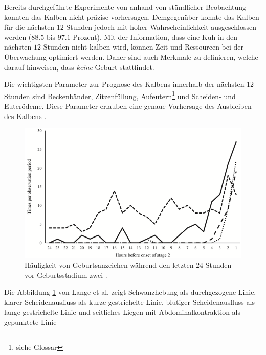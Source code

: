 Bereits durchgeführte Experimente von \citep[S. 1]{Lange2017} anhand von stündlicher Beobachtung konnten das Kalben nicht präzise vorhersagen. Demgegenüber konnte das Kalben für die nächsten $12$ Stunden jedoch mit hoher Wahrscheinlichkeit ausgeschlossen werden ($88.5$ bis $97.1$ Prozent). Mit der Information, dass eine Kuh in den nächsten $12$ Stunden nicht kalben wird, können Zeit und Ressourcen bei der Überwachung optimiert werden. Daher sind auch Merkmale zu definieren, welche darauf hinweisen, dass \textit{keine} Geburt stattfindet.

Die wichtigsten Parameter zur Prognose des Kalbens innerhalb der nächsten $12$ Stunden sind Beckenbänder, Zitzenfüllung, \gls{Aufeutern}\footnote{\label{glossar-aufeutern}siehe Glossar} und Scheiden- und Euterödeme. Diese Parameter erlauben eine genaue Vorhersage des Ausbleiben des Kalbens \citep[S. 4]{Streyl2011}.



\begin{figure}[H]
	\center
	\includegraphics[scale=.45]{Grafiken/observationTimes.png}
	\caption{Häufigkeit von Geburtsanzeichen während den letzten $24$ Stunden vor Geburtsstadium zwei \citep[S.5]{Lange2017}.}
	\label{fig: Häufigkeit von Geburtsanzeichen }
\end{figure}

Die Abbildung \ref{fig: Häufigkeit von Geburtsanzeichen } von Lange et al. zeigt Schwanzhebung als durchgezogene Linie, klarer Scheidenausfluss als kurze gestrichelte Linie,  blutiger Scheidenausfluss als lange gestrichelte Linie und seitliches Liegen mit Abdominalkontraktion als gepunktete Linie
